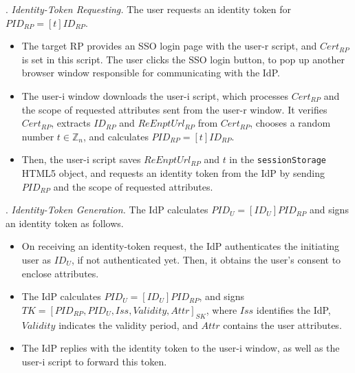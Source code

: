 . {\em Identity-Token Requesting.}
The user requests an identity token for $PID_{RP} = [t]{ID_{RP}}$.
\begin{itemize}
\setlength{\topsep}{0pt}
\setlength{\partopsep}{0pt}
\setlength{\itemsep}{0pt}
\setlength{\parsep}{0pt}
\setlength{\parskip}{0pt}
\item[1.1]
The target RP provides an SSO login page with the user-r script,
    and $Cert_{RP}$ is set in this script.
The user clicks the SSO login button,
    to pop up another browser window responsible for communicating with the IdP.
\item[1.2] The user-i window downloads the user-i script,
which processes $Cert_{RP}$ and the scope of requested attributes sent from the user-r window.
It verifies $Cert_{RP}$, extracts $ID_{RP}$ and $ReEnptUrl_{RP}$ from $Cert_{RP}$, 
chooses a random number $t \in \mathbb{Z}_n$,
    and calculates $PID_{RP}=[t]{ID_{RP}}$.
\item[1.3] 
Then, the user-i script saves $ReEnptUrl_{RP}$ and $t$ in the \verb+sessionStorage+ HTML5 object,
    and requests an identity token from the IdP by sending $PID_{RP}$ and the scope of requested attributes.
\end{itemize}


. {\em Identity-Token Generation.}
The IdP calculates $PID_U = [ID_U]{PID_{RP}}$ and signs an identity token as follows. %
\begin{itemize}
\setlength{\topsep}{0pt}
\setlength{\partopsep}{0pt}
\setlength{\itemsep}{0pt}
\setlength{\parsep}{0pt}
\setlength{\parskip}{0pt}
\item[2.1]
On receiving an identity-token request,
the IdP authenticates the initiating user as $ID_U$, if not authenticated yet.
Then, it obtains the user's consent to enclose attributes.
\item[2.2]
The IdP calculates $PID_U = [ID_U]{PID_{RP}}$, and signs $TK = [PID_{RP}, PID_U, Iss, Validity, Attr]_{SK}$,
where $Iss$ identifies the IdP, $Validity$ indicates the validity period, and $Attr$ contains the user attributes.
\item[2.3] The IdP replies with the identity token to the user-i window,
    as well as the user-i script to forward this token.
\end{itemize}


